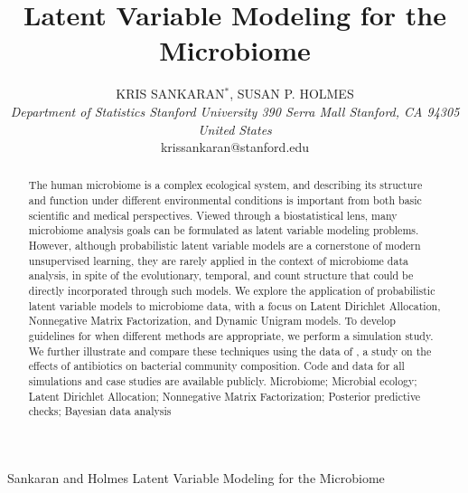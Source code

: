 \documentclass{article}
\begin{document}
\title{Latent Variable Modeling for the Microbiome}

\author{
  KRIS SANKARAN$^\ast$, SUSAN P. HOLMES\\[4pt]
  \textit{
    Department of Statistics
    Stanford University
    390 Serra Mall
    Stanford, CA 94305
    United States
  } \\[2pt]
  {krissankaran@stanford.edu}
}

\markboth
{Sankaran and Holmes}
{Latent Variable Modeling for the Microbiome}

\maketitle


\begin{abstract}
  {
    The human microbiome is a complex ecological system, and describing its
    structure and function under different environmental conditions is important
    from both basic scientific and medical perspectives. Viewed through a
    biostatistical lens, many microbiome analysis goals can be formulated as
    latent variable modeling problems. However, although probabilistic latent
    variable models are a cornerstone of modern unsupervised learning, they are
    rarely applied in the context of microbiome data analysis, in spite of the
    evolutionary, temporal, and count structure that could be directly
    incorporated through such models. We explore the application of
    probabilistic latent variable models to microbiome data, with a focus on
    Latent Dirichlet Allocation, Nonnegative Matrix Factorization, and Dynamic
    Unigram models. To develop guidelines for when different methods are
    appropriate, we perform a simulation study. We further illustrate and
    compare these techniques using the data of \cite{dethlefsen2011incomplete},
    a study on the effects of antibiotics on bacterial community composition.
    Code and data for all simulations and case studies are available publicly.}
  {
    Microbiome; Microbial ecology; Latent Dirichlet Allocation; Nonnegative
    Matrix Factorization; Posterior predictive checks; Bayesian data analysis
  }
\end{abstract}
\end{document}

